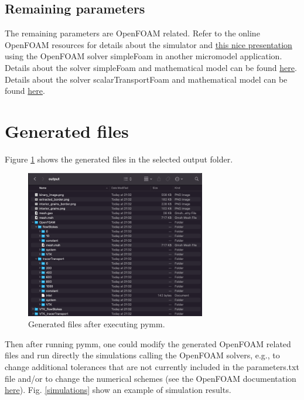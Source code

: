 \documentclass[10pt]{article}
\begin{document}
\subsection{Remaining parameters}
The remaining parameters are OpenFOAM related. Refer to the online OpenFOAM resources for details about the simulator and \href{https://www.slideshare.net/ElwardiFadli/permeability-of-soils}{this nice presentation} using the OpenFOAM solver simpleFoam in another micromodel application. Details about the solver simpleFoam and mathematical model can be found \href{https://openfoamwiki.net/index.php/OpenFOAM_guide/The_SIMPLE_algorithm_in_OpenFOAM}{here}. Details about the solver scalarTransportFoam and mathematical model can be found \href{https://openfoamwiki.net/index.php/ScalarTransportFoam}{here}. 

\section{Generated files}
Figure \ref{output} shows the generated files in the selected output folder.
\begin{figure}[h!]
\centering
\includegraphics[width=0.7\textwidth]{output.png}
\caption{Generated files after executing pymm.}
\label{output} 
\end{figure}

Then after running pymm, one could modify the generated OpenFOAM related files and run directly the simulations calling the OpenFOAM solvers, e.g., to change additional tolerances that are not currently included in the parameters.txt file and/or to change the numerical schemes (see the OpenFOAM documentation \href{https://www.openfoam.com/documentation/user-guide/6-solving/6.2-numerical-schemes}{here}). Fig. \ref{simulations} show an example of simulation results.
\end{document}
